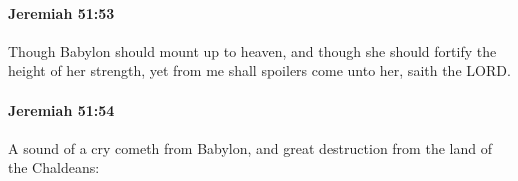		\paragraph{Jeremiah 51:53} %
			\label{JEREMIAH-51-53}

			Though Babylon should mount up to heaven, and though she should fortify the height of her strength, yet from me shall spoilers come unto her, saith the LORD.


		\paragraph{Jeremiah 51:54} %
			\label{JEREMIAH-51-54}

			A sound of a cry cometh from Babylon, and great destruction from the land of the Chaldeans:



